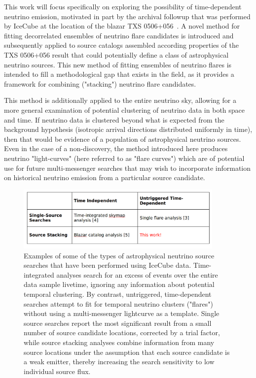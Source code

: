 This work will focus specifically on exploring the possibility of time-dependent neutrino emission, motivated in part by the archival followup that was performed by IceCube at the location of the blazar TXS 0506+056~\cite{TXS_Archival}. A novel method for fitting decorrelated ensembles of neutrino flare candidates is introduced and subsequently applied to source catalogs assembled according properties of the TXS 0506+056 result that could potentially define a class of astrophysical neutrino sources. This new method of fitting ensembles of neutrino flares is intended to fill a methodological gap that exists in the field, as it provides a framework for combining ("stacking") neutrino flare candidates. 

This method is additionally applied to the entire neutrino sky, allowing for a more general examination of potential clustering of neutrino data in both space and time. If neutrino data is clustered beyond what is expected from the background hypothesis (isotropic arrival directions distributed uniformly in time), then that would be evidence of a population of astrophysical neutrino sources. Even in the case of a non-discovery, the method introduced here produces neutrino "light-curves" (here referred to as "flare curves") which are of potential use for future multi-messenger searches that may wish to incorporate information on historical neutrino emission from a particular source candidate.  

\begin{figure}[h]
\centering
\includegraphics[width=0.9\textwidth]{figs/ana_table.png}
\caption{Examples of some of the types of astrophysical neutrino source searches that have been performed using IceCube data. Time-integrated analyses search for an excess of events over the entire data sample livetime, ignoring any information about potential temporal clustering. By contrast, untriggered, time-dependent searches attempt to fit for temporal neutrino clusters ("flares") without using a multi-messenger lightcurve as a template. Single source searches report the most significant result from a small number of source candidate locations, corrected by a trial factor, while source stacking analyses combine information from many source locations under the assumption that each source candidate is a weak emitter, thereby increasing the search sensitivity to low individual source flux.}
\label{tab:anatable}
\end{figure}

